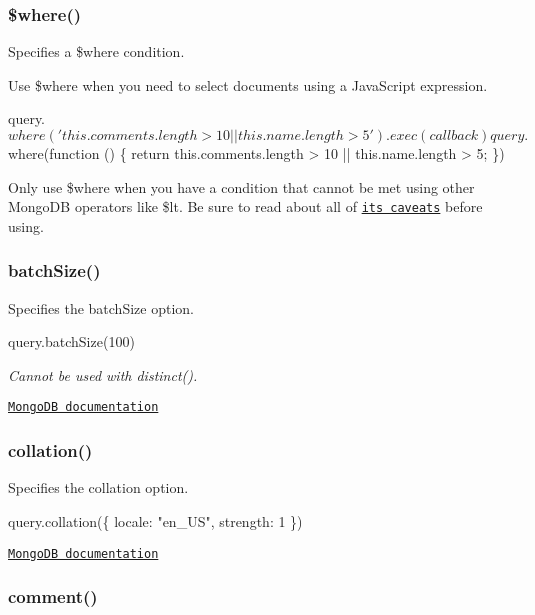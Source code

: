 \subsubsection*{\$where()}

Specifies a {\ttfamily \$where} condition.

Use {\ttfamily \$where} when you need to select documents using a Java\+Script expression.


\begin{DoxyCode}
query.$where('this.comments.length > 10 || this.name.length > 5').exec(callback)

query.$where(function () \{
  return this.comments.length > 10 || this.name.length > 5;
\})
\end{DoxyCode}


Only use {\ttfamily \$where} when you have a condition that cannot be met using other Mongo\+DB operators like {\ttfamily \$lt}. Be sure to read about all of \href{http://docs.mongodb.org/manual/reference/operator/where/}{\tt its caveats} before using. 



\subsubsection*{batch\+Size()}

Specifies the batch\+Size option.


\begin{DoxyCode}
query.batchSize(100)
\end{DoxyCode}


{\itshape Cannot be used with {\ttfamily distinct()}.}

\href{http://docs.mongodb.org/manual/reference/method/cursor.batchSize/}{\tt Mongo\+DB documentation}

\subsubsection*{collation()}

Specifies the collation option.


\begin{DoxyCode}
query.collation(\{ locale: "en\_US", strength: 1 \})
\end{DoxyCode}


\href{https://docs.mongodb.com/manual/reference/method/cursor.collation/#cursor.collation}{\tt Mongo\+DB documentation}

\subsubsection*{comment()}

